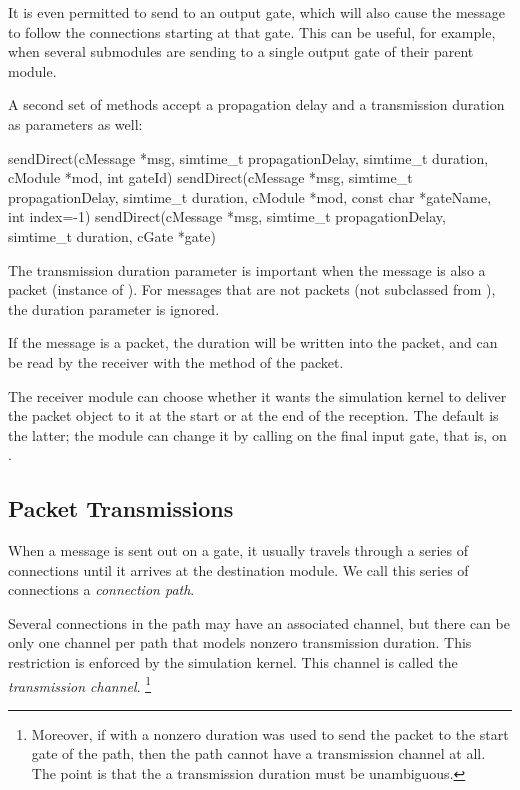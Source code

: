 \begin{ned}
It is even permitted to send to an output gate, which will also cause the
message to follow the connections starting at that gate.
This can be useful, for example, when several submodules are sending
to a single output gate of their parent module.

A second set of  methods accept a propagation
delay and a transmission duration as parameters as well:

\begin{cpp}
sendDirect(cMessage *msg, simtime_t propagationDelay, simtime_t duration,
           cModule *mod, int gateId)
sendDirect(cMessage *msg, simtime_t propagationDelay, simtime_t duration,
           cModule *mod, const char *gateName, int index=-1)
sendDirect(cMessage *msg, simtime_t propagationDelay, simtime_t duration,
           cGate *gate)
\end{cpp}

The transmission duration parameter is important when the message is also
a packet (instance of ). For messages that are not packets
(not subclassed from ), the duration parameter
is ignored.

If the message is a packet, the duration will be written into the packet,
and can be read by the receiver with the  method of
the packet.

The receiver module can choose whether it wants the simulation kernel
to deliver the packet object to it at the start or at the end of the
reception. The default is the latter; the module can change it by calling
 on the final input gate, that is, on
.


\subsection{Packet Transmissions}
\label{sec:simple-modules:packet-transmission}

When a message is sent out on a gate, it usually travels through
a series of connections until it arrives at the destination module.
We call this series of connections a \textit{connection path}.

Several connections in the path may have an associated channel,
but there can be only one channel per path that models nonzero
transmission duration. This restriction is enforced by the simulation
kernel. This channel is called the \textit{transmission channel}.
  \footnote{Moreover, if  with a nonzero duration
  was used to send the packet to the start gate of the path,
  then the path cannot have a transmission channel at all.
  The point is that the a transmission duration must be unambiguous.}


\end{ned}
